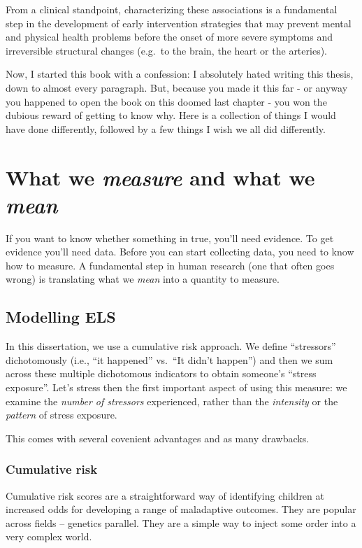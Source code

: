 \documentclass[
  letterpaper,
  DIV=11,
  numbers=noendperiod]{scrreport}
\begin{document}
From a clinical standpoint, characterizing these associations is a
fundamental step in the development of early intervention strategies
that may prevent mental and physical health problems before the onset of
more severe symptoms and irreversible structural changes (e.g.~to the
brain, the heart or the arteries).

Now, I started this book with a confession: I absolutely hated writing
this thesis, down to almost every paragraph. But, because you made it
this far - or anyway you happened to open the book on this doomed last
chapter - you won the dubious reward of getting to know why. Here is a
collection of things I would have done differently, followed by a few
things I wish we all did differently.

\section{\texorpdfstring{What we \emph{measure} and what we
\emph{mean}}{What we measure and what we mean}}\label{what-we-measure-and-what-we-mean}

If you want to know whether something in true, you'll need evidence. To
get evidence you'll need data. Before you can start collecting data, you
need to know how to measure. A fundamental step in human research (one
that often goes wrong) is translating what we \emph{mean} into a
quantity to measure.

\subsection{Modelling ELS}\label{modelling-els}

In this dissertation, we use a cumulative risk approach. We define
``stressors'' dichotomously (i.e., ``it happened'' vs.~``It didn't
happen'') and then we sum across these multiple dichotomous indicators
to obtain someone's ``stress exposure''. Let's stress then the first
important aspect of using this measure: we examine the \emph{number of
stressors} experienced, rather than the \emph{intensity} or the
\emph{pattern} of stress exposure.

This comes with several covenient advantages and as many drawbacks.

\subsubsection{Cumulative risk}\label{cumulative-risk}

Cumulative risk scores are a straightforward way of identifying children
at increased odds for developing a range of maladaptive outcomes. They
are popular across fields -- genetics parallel. They are a simple way to
inject some order into a very complex world.
\end{document}
